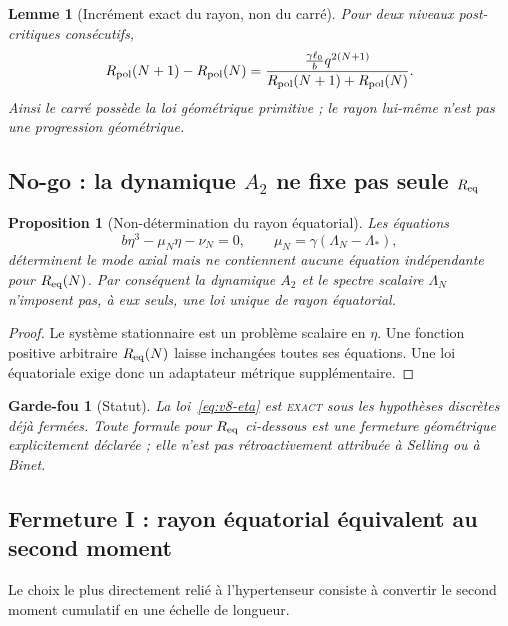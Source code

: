 \documentclass[11pt,a4paper]{article}
\newtheorem{proposition}[theorem]{Proposition}
\newtheorem{lemma}[theorem]{Lemme}
\newtheorem{guardrail}[theorem]{Garde-fou}
\newcommand{\statusExact}{\textsc{exact}}
\begin{document}
\begin{lemma}[Incrément exact du rayon, non du carré]\label{lem:v8-radius-increment}
Pour deux niveaux post-critiques consécutifs,
\begin{equation}\label{eq:v8-radius-rationalized}
 R_{\rm pol}(N+1)-R_{\rm pol}(N)
 =
 \frac{\frac{\gamma\ell_0}{b}q^{2(N+1)}}
 {R_{\rm pol}(N+1)+R_{\rm pol}(N)}.
\end{equation}
Ainsi le carré possède la loi géométrique primitive ; le rayon lui-même n'est pas une progression géométrique.
\end{lemma}

\subsection{No-go : la dynamique $A_2$ ne fixe pas seule $R_{\rm eq}$}

\begin{proposition}[Non-détermination du rayon équatorial]\label{prop:v8-Req-no-go}
Les équations
\[
 b\eta^3-\mu_N\eta-\nu_N=0,
 \qquad
 \mu_N=\gamma(\Lambda_N-\Lambda_*),
\]
déterminent le mode axial mais ne contiennent aucune équation indépendante pour $R_{\rm eq}(N)$. Par conséquent la dynamique $A_2$ et le spectre scalaire $\Lambda_N$ n'imposent pas, à eux seuls, une loi unique de rayon équatorial.
\end{proposition}

\begin{proof}
Le système stationnaire est un problème scalaire en $\eta$. Une fonction positive arbitraire $R_{\rm eq}(N)$ laisse inchangées toutes ses équations. Une loi équatoriale exige donc un adaptateur métrique supplémentaire.
\end{proof}

\begin{guardrail}[Statut]
La loi~\eqref{eq:v8-eta} est \statusExact{} sous les hypothèses discrètes déjà fermées. Toute formule pour $R_{\rm eq}$ ci-dessous est une fermeture géométrique explicitement déclarée ; elle n'est pas rétroactivement attribuée à Selling ou à Binet.
\end{guardrail}

\subsection{Fermeture I : rayon équatorial équivalent au second moment}

Le choix le plus directement relié à l'hypertenseur consiste à convertir le second moment cumulatif en une échelle de longueur.
\end{document}
